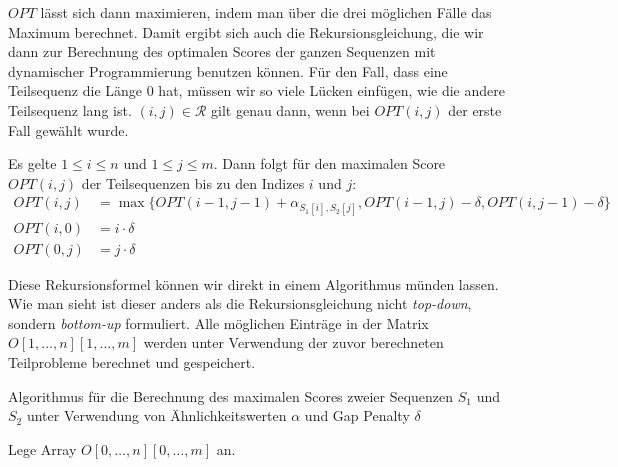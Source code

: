 $OPT$ lässt sich dann maximieren, indem man über die drei möglichen Fälle das Maximum berechnet. Damit ergibt sich auch die Rekursionsgleichung, die wir dann zur Berechnung des optimalen Scores der ganzen Sequenzen mit dynamischer Programmierung benutzen können. Für den Fall, dass eine Teilsequenz die Länge 0 hat, müssen wir so viele Lücken einfügen, wie die andere Teilsequenz lang ist. $(i,j) \in \mathcal{R}$ gilt genau dann, wenn bei $OPT(i,j)$ der erste Fall gewählt wurde.

\begin{korollar}
	Es gelte $1 \leq i \leq n$ und $1 \leq j \leq m$. Dann folgt für den maximalen Score $OPT(i,j)$ der Teilsequenzen bis zu den Indizes $i$ und $j$:
	\begin{equation}
	\begin{split}
		OPT(i,j) & = \max\{OPT(i-1,j-1) + \alpha_{S_1[i],S_2[j]}, OPT(i-1,j) - \delta, OPT(i,j-1) - \delta\} \\
		OPT(i,0) & = i\cdot \delta \\
		OPT(0,j) & = j\cdot \delta 
	\end{split}
	\end{equation}
\end{korollar}

Diese Rekursionsformel können wir direkt in einem Algorithmus münden lassen. Wie man sieht ist dieser anders als die Rekursionsgleichung nicht \emph{top-down}, sondern \emph{bottom-up} formuliert. Alle möglichen Einträge in der Matrix $O[1,\dots,n][1,\dots,m]$ werden unter Verwendung der zuvor berechneten Teilprobleme berechnet und gespeichert. 

\begin{algorithm}
	\caption{Algorithmus für die Berechnung des maximalen Scores zweier Sequenzen $S_1$ und $S_2$ unter Verwendung von Ähnlichkeitswerten $\alpha$ und Gap Penalty $\delta$}
	\label{alg:opt_nw}
	\begin{algorithmic}[1]
		\State Lege Array $O[0,\dots,n][0,\dots,m]$ an.
		 
		\EndFor
		 
		\EndFor
			\EndFor
		\EndFor
		\EndProcedure
	\end{algorithmic}
\end{algorithm}

